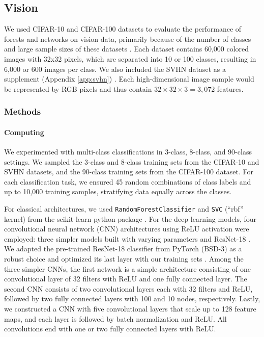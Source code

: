 \subsection{Vision}
\label{vision}
We used CIFAR-10 and CIFAR-100 datasets to evaluate the performance of forests and networks on vision data, primarily because of the number of classes and large sample sizes of these datasets \citep{cifar}.
Each dataset contains 60,000 colored images with 32x32 pixels, which are separated into 10 or 100 classes, resulting in 6,000 or 600 images per class.
We also included the SVHN dataset as a supplement (Appendix \ref{app:svhn}) \citep{svhn}. 
Each high-dimensional image sample would be represented by RGB pixels and thus contain $32 \times 32 \times 3 = 3,072$ features.

\subsubsection{Methods}
\paragraph{Computing}
We experimented with multi-class classifications in 3-class, 8-class, and 90-class settings. We sampled the 3-class and 8-class training sets from the CIFAR-10 and SVHN datasets, and the 90-class training sets from the CIFAR-100 dataset. For each classification task, we ensured 45 random combinations of class labels and up to 10,000 training samples, stratifying data equally across the classes.

For classical architectures, we used \texttt{RandomForestClassifier} and \texttt{SVC} (``rbf'' kernel) from the scikit-learn python package \citep{scikit-learn}. For the deep learning models, four convolutional neural network (CNN) architectures using ReLU activation were employed: three simpler models built with varying parameters and ResNet-18 \citep{Priebe2020.04.29.068460, resnet}. We adapted the pre-trained ResNet-18 classifier from PyTorch (BSD-3) as a robust choice and optimized its last layer with our training sets \citep{pytorch}. Among the three simpler CNNs, the first network is a simple architecture consisting of one convolutional layer of 32 filters with ReLU and one fully connected layer. The second CNN consists of two convolutional layers each with 32 filters and ReLU, followed by two fully connected layers with 100 and 10 nodes, respectively. Lastly, we constructed a CNN with five convolutional layers that scale up to 128 feature maps, and each layer is followed by batch normalization and ReLU. All convolutions end with one or two fully connected layers with ReLU.

